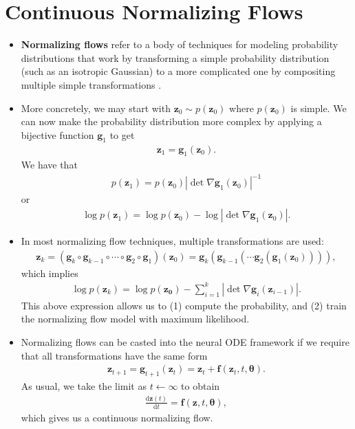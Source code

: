 \documentclass[10pt]{article}
\newcommand{\dee}{\mathrm{d}}
\newcommand{\ve}[1]{\mathbf{#1}}
\newcommand{\ves}[1]{\boldsymbol{#1}}
\begin{document}
\section{Continuous Normalizing Flows}

\begin{itemize}
  \item {\bf Normalizing flows} refer to a body of techniques for modeling probability distributions that work by transforming a simple probability distribution (such as an isotropic Gaussian) to a more complicated one by compositing multiple simple transformations \cite{Kobyzev:2021}.
  
  \item More concretely, we may start with $\ve{z}_0 \sim p(\ve{z}_0)$ where $p(\ve{z}_0)$ is simple. We can now make the probability distribution more complex by applying a bijective function $\ve{g}_1$ to get
  \begin{align*}
    \ve{z}_1 = \ve{g}_1(\ve{z}_0).
  \end{align*}
  We have that
  \begin{align*}
    p(\ve{z}_1) = p(\ve{z}_0) |\det \nabla \ve{g}_1(\ve{z}_0) |^{-1}
  \end{align*}
  or
  \begin{align*}
    \log p(\ve{z}_1) = \log p(\ve{z}_0) - \log | \det \nabla \ve{g}_1(\ve{z}_0) |.
  \end{align*}

  \item In most normalizing flow techniques, multiple transformations are used:
  \begin{align*}
    \ve{z}_k = (\ve{g}_k \circ \ve{g}_{k-1} \circ \dotsb \circ \ve{g}_2 \circ \ve{g}_1)(\ve{z}_0)
    = \ve{g}_k(\ve{g}_{k-1}(\dotsm\ve{g}_2(\ve{g}_1(\ve{z}_0)))),
  \end{align*}
  which implies
  \begin{align} \label{eqn:normalizing-flow-log-p}
    \log p(\ve{z}_k) = \log p(\ve{z_0}) - \sum_{i=1}^k |\det \nabla \ve{g}_i(\ve{z}_{i-1}) |.
  \end{align}
  This above expression allows us to (1) compute the probability, and (2) train the normalizing flow model with maximum likelihood.

  \item Normalizing flows can be casted into the neural ODE framework if we require that all transformations have the same form
  \begin{align*}
    \ve{z}_{t+1} = \ve{g}_{t+1}(\ve{z}_t) = \ve{z}_t + \ve{f}(\ve{z}_t, t, \ves{\theta}).
  \end{align*}
  As usual, we take the limit as $t \gets \infty$ to obtain
  \begin{align*}
    \frac{\dee \ve{z}(t)}{\dee t} = \ve{f}(\ve{z}, t, \ves{\theta}),
  \end{align*}
  which gives us a continuous normalizing flow.


\end{itemize}
\end{document}

